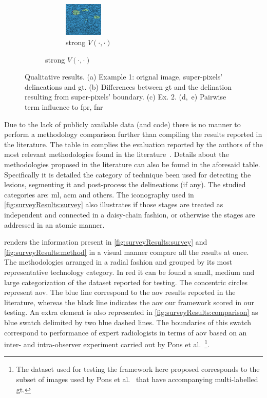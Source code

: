 \begin{figure}[h]
\begin{subfigure}[b]{0.15\textwidth}
\begin{subfigure}[b]{\textwidth}
      \label{fig:resuts:smallPWterm}
    \end{subfigure}
    \begin{subfigure}[b]{\textwidth}
      \vspace{5pt}
      \includegraphics[trim = 0 90 0 0, clip, height=1.6cm]{fpHom}
      \caption{\small strong $V(\cdot,\cdot)$}
      \label{fig:results:bigPWterm}
    \end{subfigure}
  \end{subfigure}

  \caption{\small Qualitative results. 
    (a) Example 1: orignal image, super-pixels' delineations and \ac{gt}. 
    (b) Differences between \ac{gt} and the delination resulting from super-pixels' boundary.
    (c) Ex. 2.
    (d,~e) Pairwise term influence to \ac{fpr}, \ac{fnr}}
  \label{fig:results}
\end{figure}

Due to the lack of publicly available data (and code) there is no manner to perform a methodology comparison further than compiling the results reported in the literature.
The table in  complies the evaluation reported by the authors of the most relevant methodologies found in the literature~\cite{massich2013phd}.
Details about the methodologies proposed in the literature can also be found in the aforesaid table.
Specifically it is detailed the category of technique been used for detecting the lesions, segmenting it and post-process the delineations (if any).
The studied categories are: \ac{ml}, \ac{acm} and others.
The iconography used in \cref{fig:surveyResults:survey} also illustrates if those stages are treated as independent and connected in a daisy-chain fashion, or otherwise the stages are addressed in an atomic manner.

 renders the information present in \cref{fig:surveyResults:survey} and \cref{fig:surveyResults:method} in a visual manner compare all the results at once.
The methodologies arranged in a radial fashion and grouped by its most representative technology category. 
In red it can be found a small, medium and large categorization of the dataset reported for testing.
The concentric circles represent \ac{aov}. 
The blue line correspond to the \ac{aov} results reported in the literature, whereas the black line indicates the \ac{aov} our framework scored in our testing.
An extra element is also represented in \cref{fig:surveyResults:comparison} as blue swatch delimited by two blue dashed lines.
The boundaries of this swatch correspond to performance of expert radiologists in terms of \ac{aov} based on an inter- and intra-observer experiment carried out by Pons et al.~\cite{gerard2013}\footnote{The dataset used for testing the framework here proposed corresponds to the subset of images used by Pons et al.~\cite{gerard2013} that have accompanying multi-labelled \ac{gt}.}.

